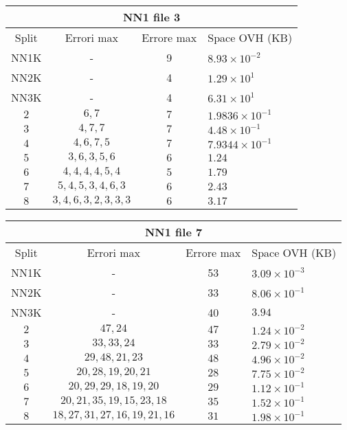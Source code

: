 \documentclass[]{article}
\begin{document}
	\begin{center}
		\begin{tabular}{|c | c | c | l|}
		\hline
		\multicolumn{4}{c}{NN1 file 3} \\
			\hline
			Split & Errori max & Errore max & Space OVH (KB) \\ \hline
			 NN1K & - & 9 & $8.93 \times 10^{-2}$\\ 
			 NN2K & - & 4 & $1.29\times 10^{1}$ \\
			 NN3K & - & 4 &  $6.31\times 10^{1}$ \\
			 $2$ & $6, 7$ & $7$ & $1.9836\times 10^{-1}$ \\ 
			 $3$ & $4, 7, 7$ & $7$ & $4.48\times 10^{-1}$ \\ 
			 $4$ & $4, 6, 7, 5$ & $7$ & $7.9344\times 10^{-1}$ \\ 
			 $5$ & $3, 6, 3, 5, 6$ & $6$ & $1.24$ \\ 
			 $6$ & $4, 4, 4, 4, 5, 4$ & $5$ & $1.79$ \\ 
			 $7$ & $5, 4, 5, 3, 4, 6, 3$ & $6$ & $2.43$ \\ 
			 $8$ & $3, 4, 6, 3, 2, 3, 3, 3$ & $6$ & $3.17$ \\
			\hline  
	
		\end{tabular}
	\end{center}

	\begin{center}
		\begin{tabular}{| c | c | c | l |}
		\hline
		\multicolumn{4}{c}{NN1 file 7} \\
		\hline
		Split & Errori max & Errore max & Space OVH (KB) \\ \hline
		NN1K & - & 53 & $3.09 \times 10^{-3}$ \\ 
		NN2K & - & 33 & $8.06 \times 10^{-1}$\\
		NN3K & - & 40 & $3.94$\\
		
		$2$ & $47, 24$ & $47$ & $1.24\times 10^{-2}$ \\ 
		$3$ & $33, 33, 24$ & $33$ & $2.79\times 10^{-2}$ \\ 
		$4$ & $29, 48, 21, 23$ & $48$ & $4.96\times 10^{-2}$ \\ 
		$5$ & $20, 28, 19, 20, 21$ & $28$ & $7.75 \times 10^{-2}$ \\ 
		$6$ & $20, 29, 29, 18, 19, 20$ & $29$ & $1.12\times 10^{-1}$ \\ 
		$7$ & $20, 21, 35, 19, 15, 23, 18$ & $35$ & $1.52\times 10^{-1}$ \\ 
		$8$ & $18, 27, 31, 27, 16, 19, 21, 16$ & $31$ & $1.98\times 10^{-1}$ \\
		\hline  
		\end{tabular}
	\end{center}
\end{document}

